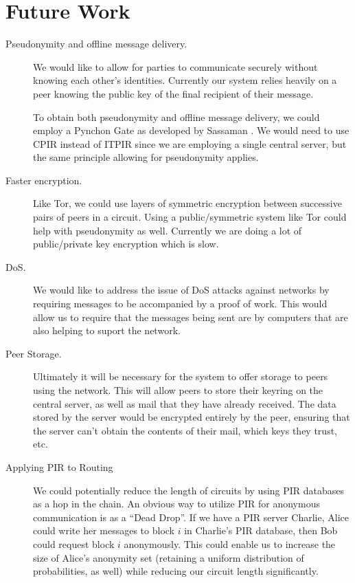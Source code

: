 \documentclass[twocolumn,11pt,english]{article}
\begin{document}
\section{Future Work}
\begin{description}
\item[Pseudonymity and offline message delivery.] We would like to allow for parties to communicate securely without knowing each other's identities. Currently our system relies heavily on a peer knowing the public key of the final recipient of their message. 

To obtain both pseudonymity and offline message delivery, we could employ a Pynchon Gate as developed by Sassaman \cite{sassaman:wpes2005}. We would need to use CPIR instead of ITPIR since we are employing a single central server, but the same principle allowing for pseudonymity applies. 

\item[Faster encryption.] Like Tor, we could use layers of symmetric encryption between successive pairs of peers in a circuit. Using a public/symmetric system like Tor could help with pseudonymity as well. Currently we are doing a lot of public/private key encryption which is slow.

\item[DoS.] We would like to address the issue of DoS attacks against networks by requiring messages to be accompanied by a proof of work. This would allow us to require that the messages being sent are by computers that are also helping to suport the network.

\item[Peer Storage.]
  Ultimately it will be necessary for the system to offer storage to peers using the network. This will allow peers to store their keyring on the central server, as well as mail that they have already received. The data stored by the server would be encrypted entirely by the peer, ensuring that the server can't obtain the contents of their mail, which keys they trust, etc.  

\item[Applying PIR to Routing]
We could potentially reduce the length of circuits by using PIR databases as a hop in the chain. An obvious way to utilize PIR for anonymous communication is as a ``Dead Drop''. If we have a PIR server Charlie, Alice could write her messages to block $i$ in Charlie's PIR database, then Bob could request block $i$ anonymously. This could enable us to increase the size of Alice's anonymity set (retaining a uniform distribution of probabilities, as well) while reducing our circuit length significantly. 


\end{description}
\end{document}

